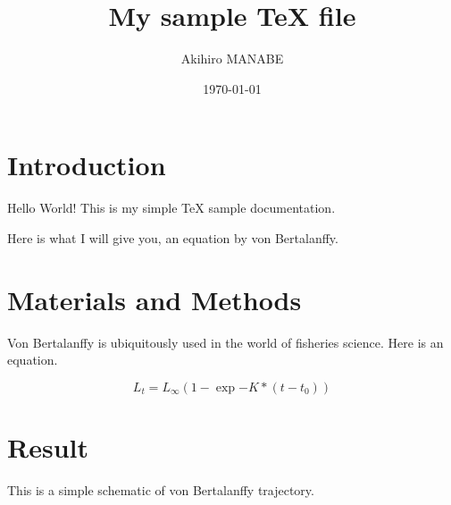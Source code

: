 \documentclass[a4j,12pt]{jreport}
\title{My sample TeX file}
\author{Akihiro MANABE}
\date{\today}
\begin{document}
\maketitle

\section{Introduction}
Hello World! This is my simple TeX sample documentation.

Here is what I will give you, an equation by von Bertalanffy.

\section{Materials and Methods}

Von Bertalanffy is ubiquitously used in the world of fisheries science. Here is an equation.

\begin{equation}
L_t = L_\infty (1-\exp{-K * (t-t_0)})
\end{equation}

\section{Result}

This is a simple schematic of von Bertalanffy trajectory.
\end{document}
